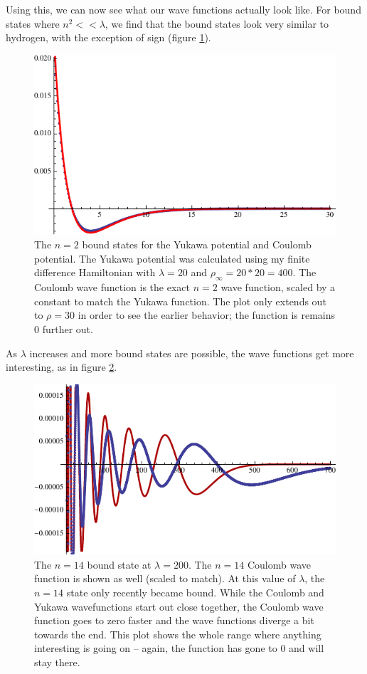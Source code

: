 \documentclass[12pt,twoside]{reedthesis}
\begin{document}
Using this, we can now see what our wave functions actually look like. For bound states where $n^2 << \lambda$, we find that the bound states look very similar to hydrogen, with the exception of sign (figure \ref{fig:hyd-yukawa}).
\begin{figure}[h]
\centering
\includegraphics{Figures/n2hydyukawa}
\caption{The $n = 2$ bound states for the Yukawa potential and Coulomb potential. The Yukawa potential was calculated using my finite difference Hamiltonian with $\lambda = 20$ and  $\rho_{\infty} = 20*20 = 400$. The Coulomb wave function is the exact $n=2$ wave function, scaled by a constant to match the Yukawa function. The plot only extends out to $\rho = 30$ in order to see the earlier behavior; the function is remains 0 further out.}
\label{fig:hyd-yukawa}
\end{figure}
As $\lambda$ increases and more bound states are possible, the wave functions get more interesting, as in figure \ref{fig:largebound}.
\begin{figure}[h]
\centering
\includegraphics{Figures/hyukawa14}
\caption{The $n=14$ bound state at $\lambda = 200$. The $n=14$ Coulomb wave function is shown as well (scaled to match). At this value of $\lambda$, the $n=14$ state only recently became bound. While the Coulomb and Yukawa wavefunctions start out close together, the Coulomb wave function goes to zero faster and the wave functions diverge a bit towards the end. This plot shows the whole range where anything interesting is going on -- again, the function has gone to 0 and will stay there.}
\label{fig:largebound}
\end{figure}
\end{document}

